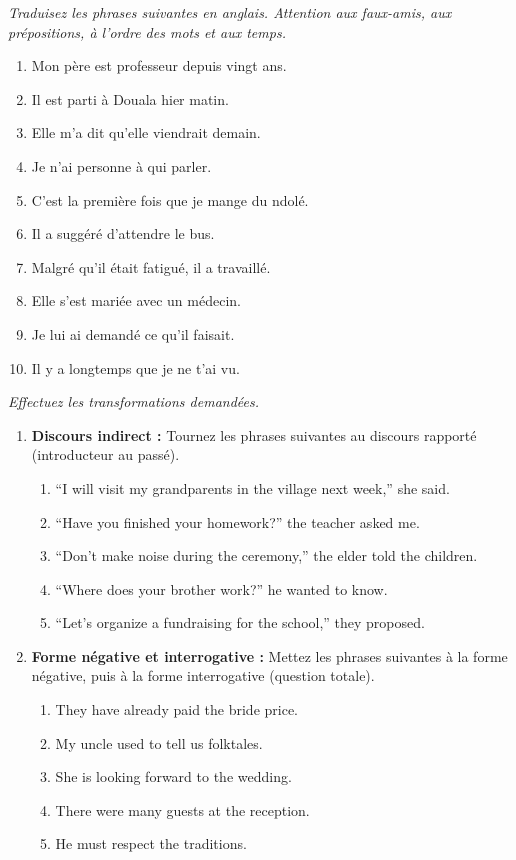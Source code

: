 \documentclass[11pt]{article}
\newcounter{popsec}
\newcounter{popsub}
\newcommand{\courssub}[1]{%
  \stepcounter{popsub}%
  \par\vspace{9pt}\noindent{\popxbold\fontsize{11.5}{13}\selectfont\color{popink}{\color{poporange}\thepopsec.\thepopsub}\hspace{6pt}#1}\par\nopagebreak\vspace{4pt}
}
\begin{document}
\courssub{Je m'entraîne}

\begin{exercice}
\emph{Traduisez les phrases suivantes en anglais. Attention aux faux-amis, aux prépositions, à l'ordre des mots et aux temps.}
\begin{enumerate}
    \item Mon père est professeur depuis vingt ans.
    \item Il est parti à Douala hier matin.
    \item Elle m'a dit qu'elle viendrait demain.
    \item Je n'ai personne à qui parler.
    \item C'est la première fois que je mange du ndolé.
    \item Il a suggéré d'attendre le bus.
    \item Malgré qu'il était fatigué, il a travaillé.
    \item Elle s'est mariée avec un médecin.
    \item Je lui ai demandé ce qu'il faisait.
    \item Il y a longtemps que je ne t'ai vu.
\end{enumerate}
\end{exercice}

\begin{exercice}
\emph{Effectuez les transformations demandées.}
\begin{enumerate}
    \item \textbf{Discours indirect :} Tournez les phrases suivantes au discours rapporté (introducteur au passé).
    \begin{enumerate}
        \item “I will visit my grandparents in the village next week,” she said.
        \item “Have you finished your homework?” the teacher asked me.
        \item “Don't make noise during the ceremony,” the elder told the children.
        \item “Where does your brother work?” he wanted to know.
        \item “Let's organize a fundraising for the school,” they proposed.
    \end{enumerate}
    \item \textbf{Forme négative et interrogative :} Mettez les phrases suivantes à la forme négative, puis à la forme interrogative (question totale).
    \begin{enumerate}
        \item They have already paid the bride price.
        \item My uncle used to tell us folktales.
        \item She is looking forward to the wedding.
        \item There were many guests at the reception.
        \item He must respect the traditions.
    \end{enumerate}
\end{enumerate}
\end{exercice}
\end{document}
